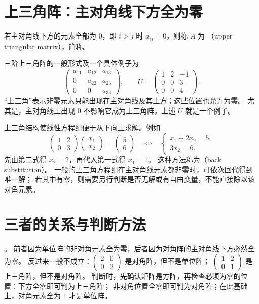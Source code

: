 \documentclass[UTF8,12pt,a4paper,fontset=fandol]{ctexart}
\begin{document}
\section{上三角阵：主对角线下方全为零}

\begin{definition}[上三角阵]
若主对角线下方的元素全部为 $0$，即 $i>j$ 时 $a_{ij}=0$，则称 $A$ 为
（upper triangular matrix），简称。
\end{definition}

三阶上三角阵的一般形式及一个具体例子为
\[
  \begin{pmatrix}a_{11}&a_{12}&a_{13}\\0&a_{22}&a_{23}\\0&0&a_{33}\end{pmatrix},
  \qquad
  U=\begin{pmatrix}1&2&-1\\0&0&3\\0&0&4\end{pmatrix}.
\]
“上三角”表示非零元素只能出现在主对角线及其上方；这些位置也允许为零。
尤其是，主对角线上出现 $0$ 不影响它成为上三角阵，上述 $U$ 就是一个例子。

上三角结构使线性方程组便于从下向上求解。例如
\[
  \begin{pmatrix}1&2\\0&3\end{pmatrix}
  \begin{pmatrix}x_1\\x_2\end{pmatrix}
  =\begin{pmatrix}5\\6\end{pmatrix}
  \quad\Longleftrightarrow\quad
  \begin{cases}x_1+2x_2=5,\\3x_2=6.\end{cases}
\]
先由第二式得 $x_2=2$，再代入第一式得 $x_1=1$。
这种方法称为（back substitution）。
一般的上三角方程组在主对角线元素都非零时，可依次回代得到唯一解；
若其中有零，则需要另行判断是否无解或有自由变量，不能直接除以该对角元素。

\section{三者的关系与判断方法}

。
前者因为单位阵的非对角元素全为零，后者因为对角阵的主对角线下方必然全为零。
反过来一般不成立：$\begin{pmatrix}2&0\\0&2\end{pmatrix}$ 是对角阵，但不是单位阵；
$\begin{pmatrix}1&2\\0&1\end{pmatrix}$ 是上三角阵，但不是对角阵。
判断时，先确认矩阵是方阵，再检查必须为零的位置：下方全零即可判为上三角阵；
非对角位置全零即可判为对角阵；在此基础上，对角元素全为 $1$ 才是单位阵。
\end{document}
